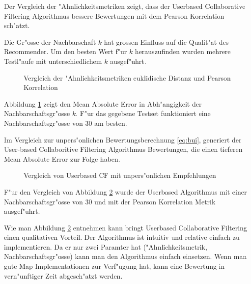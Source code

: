 \documentclass[a4paper, 12pt]{article}
\begin{document}
Der Vergleich der "Ahnlichkeitsmetriken zeigt, dass der Userbased Collaborative Filtering Algorithmus bessere Bewertungen mit dem Pearson Korrelation sch"atzt.

Die Gr"osse der Nachbarschaft $k$ hat grossen Einfluss auf die Qualit"at des Recommender. Um den besten Wert f"ur $k$ herauszufinden wurden mehrere Testl"aufe mit unterschiedlichem $k$ ausgef"uhrt.

\begin{figure}
  \centering
{}
\label{fig:nrofneighbors}
\caption{Vergleich der "Ahnlichkeitsmetriken euklidische Distanz und Pearson Korrelation}
\end{figure}

Abbildung \ref{fig:nrofneighbors} zeigt den Mean Absolute Error in Abh"angigkeit der Nachbarschaftsgr"osse $k$. F"ur das gegebene Testset funktioniert eine Nachbarschaftsgr"osse von 30 am besten.

Im Vergleich zur unpers"onlichen Bewertungsberechnung \ref{eq:bui}, generiert der User-based Collaboritive Filtering Algorithmus Bewertungen, die einen tieferen Mean Absolute Error zur Folge haben.

\begin{figure}
  \centering
{}
\label{fig:uuvsbui}
\caption{Vergleich von Userbased CF mit unpers"onlichen Empfehlungen}
\end{figure}

F"ur den Vergleich von Abbildung \ref{fig:uuvsbui} wurde der Userbased Algorithmus mit einer Nachbarschaftsgr"osse von 30 und mit der Pearson Korrelation Metrik ausgef"uhrt. 

Wie man Abbildung \ref{fig:uuvsbui} entnehmen kann bringt Userbased Collaborative Filtering einen qualitativen Vorteil. Der Algorithmus ist intuitiv und relative einfach zu implementieren. Da er nur zwei Paramter hat ("Ahnlichkeitsmetrik, Nachbarschaftsgr"osse) kann man den Algorithmus einfach einsetzen. Wenn man gute Map Implementationen zur Verf"ugung hat, kann eine Bewertung in vern"unftiger Zeit abgesch"atzt werden.
\end{document}
